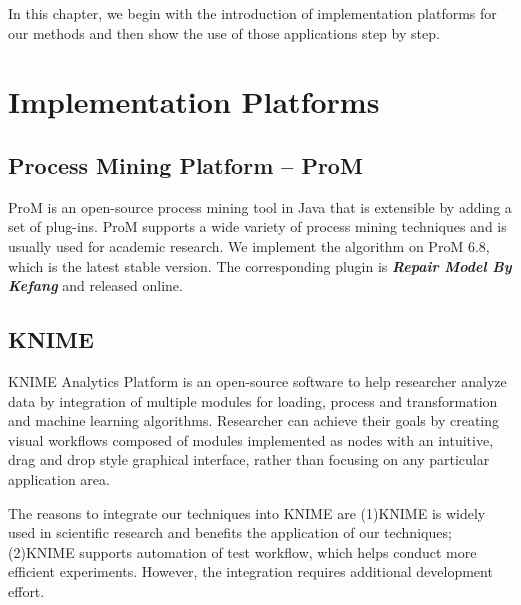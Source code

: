 In this chapter, we begin with the introduction of implementation platforms for our methods and then show the use of those applications step by step.

\section{Implementation Platforms}
\subsection{Process Mining Platform -- ProM}
ProM is an open-source process mining tool in Java that is extensible by adding a set of plug-ins\cite{ProM}. ProM supports a wide variety of process mining techniques and is usually used for academic research. We implement the algorithm on ProM 6.8, which is the latest stable version. The corresponding plugin is \textbf{\emph{Repair Model By Kefang}} and released online\cite{MyPlugin}.

\subsection{KNIME}
KNIME Analytics Platform is an open-source software to help researcher analyze data by integration of multiple modules for loading, process and transformation and machine learning algorithms. Researcher can achieve their goals by creating visual workflows composed of modules implemented as nodes with an intuitive, drag and drop style graphical interface, rather than focusing on any particular application area.

The reasons to integrate our techniques into KNIME are (1)KNIME is widely used in scientific research and benefits the application of our techniques;(2)KNIME supports automation of test workflow, which helps conduct more efficient experiments.  However, the integration requires additional development effort.

